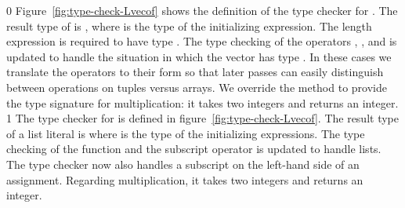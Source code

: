 \documentclass[7x10]{TimesAPriori_MIT}%
\def\racketEd{0}
\def\pythonEd{1}
\def\edition{1}
\newcommand{\pythonColor}[0]{}
\numberwithin{theorem}{chapter}
\numberwithin{definition}{chapter}
\numberwithin{equation}{chapter}
\begin{document}
{\if\edition\racketEd
%
Figure~\ref{fig:type-check-Lvecof} shows the definition of the type
checker for \LangArray{}. The result type of
 is , where  is the type
of the initializing expression.  The length expression is required to
have type . The type checking of the operators
, , and   is
updated to handle the situation in which the vector has type
. In these cases we translate the operators to their
 form so that later passes can easily distinguish
between operations on tuples versus arrays. We override the
 method to provide the type signature for
multiplication: it takes two integers and returns an integer.  \fi}
{\if\edition\pythonEd\pythonColor
%
The type checker for \LangArray{} is defined in
figure~\ref{fig:type-check-Lvecof}. The result type of a list literal
is  where  is the type of the initializing
expressions.  The type checking of the  function and the
subscript operator is updated to handle lists. The type checker now
also handles a subscript on the left-hand side of an assignment.
Regarding multiplication, it takes two integers and returns an
integer.
%
\fi}
\end{document}
